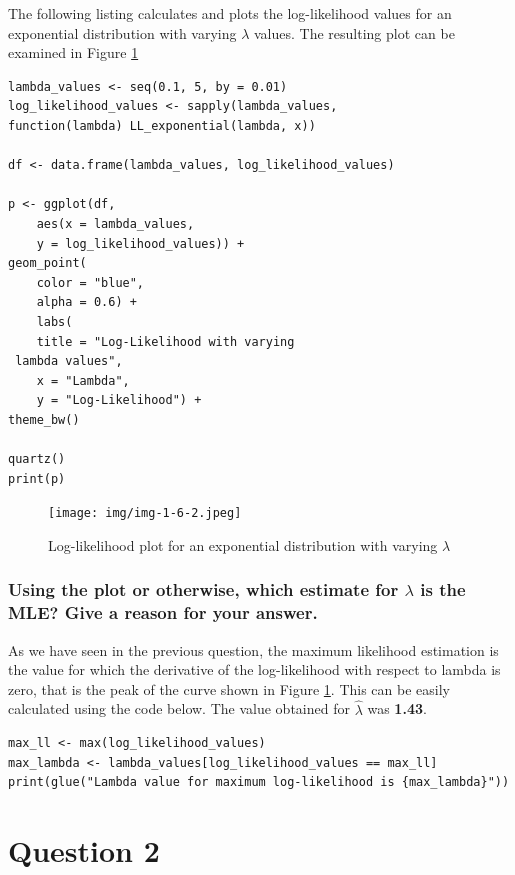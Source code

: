 \documentclass[]{article}
\begin{document}
The following listing calculates and plots the log-likelihood values for an exponential distribution with varying $\lambda$ values. The resulting plot can be examined in Figure \ref{fig:img-1-6-2}


\begin{lstlisting}
lambda_values <- seq(0.1, 5, by = 0.01)
log_likelihood_values <- sapply(lambda_values,
function(lambda) LL_exponential(lambda, x))

df <- data.frame(lambda_values, log_likelihood_values)

p <- ggplot(df, 
	aes(x = lambda_values, 
	y = log_likelihood_values)) +
geom_point(
	color = "blue",
	alpha = 0.6) +
	labs(
	title = "Log-Likelihood with varying
 lambda values",
	x = "Lambda",
	y = "Log-Likelihood") +
theme_bw()

quartz()
print(p)
\end{lstlisting}

\begin{figure}[H]
	\centering
	\texttt{[image: img/img-1-6-2.jpeg]}
	\caption{Log-likelihood plot for an exponential distribution with varying $\lambda$}
	\label{fig:img-1-6-2}
\end{figure}


\subsubsection{Using the plot or otherwise, which estimate for $\lambda$ is the MLE? Give a reason for your answer.}

As we have seen in the previous question, the maximum likelihood estimation is the value for which the derivative of the log-likelihood with respect to lambda is zero, that is the peak of the curve shown in Figure \ref*{fig:img-1-6-2}. This can be easily calculated using the code below. The value obtained for $\hat{\lambda}$ was \textbf{1.43}.

\begin{lstlisting}
max_ll <- max(log_likelihood_values)
max_lambda <- lambda_values[log_likelihood_values == max_ll]
print(glue("Lambda value for maximum log-likelihood is {max_lambda}"))
\end{lstlisting}


\section{Question 2}
\end{document}
